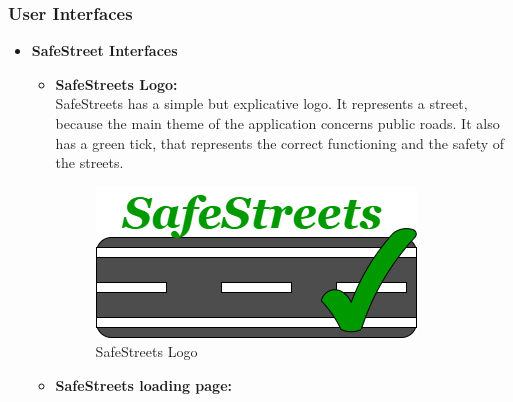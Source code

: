 \documentclass[titlepage]{article}
\begin{document}
\subsubsection{User Interfaces}
\begin{itemize}
	\item\textbf{SafeStreet Interfaces}
	\begin{itemize}
		\item \textbf{SafeStreets Logo:}\\
		SafeStreets has a simple but explicative logo. It represents a street, because the main theme of the application concerns public roads. It also has a green tick, that represents the correct functioning and the safety of the streets.\\ 
		
	\begin{figure}[h]
	\includegraphics[scale=0.8]{Mockups/LogoSafeStreets.png}
	\centering
	\caption{SafeStreets Logo}
\end{figure}
\FloatBarrier


	\newpage

	\item \textbf{SafeStreets loading page:}\\
	

\end{itemize}
\end{itemize}
\end{document}
